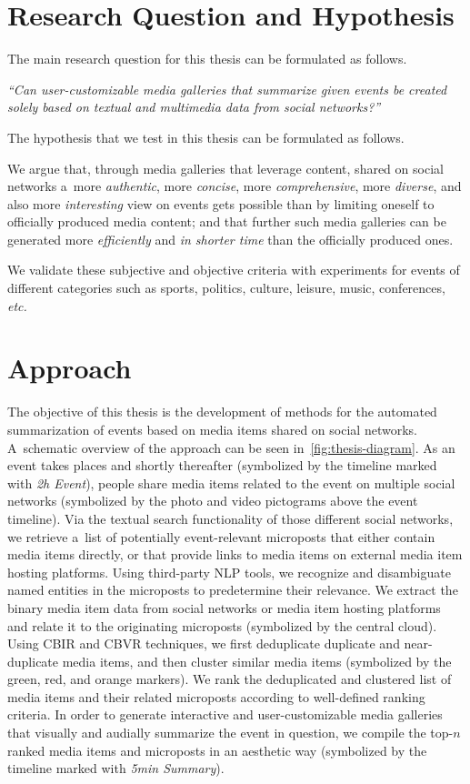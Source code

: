 \section{Research Question and Hypothesis}

The main research question for this thesis
can be formulated as follows.
 
\textit{``Can user-customizable
media galleries that summarize given events be
created solely based on textual and multimedia data
from social networks?''}

\noindent The hypothesis that we test in this thesis
can be formulated as follows.

We argue that,
through media galleries that leverage content,
shared on social networks
a~more \emph{authentic}, more \emph{concise},
more \emph{comprehensive}, more \emph{diverse},
and also more \emph{interesting}
view on events gets possible than by limiting oneself
to officially produced media content;
and that further such media galleries can be generated
more \emph{efficiently} and \emph{in shorter time}
than the officially produced ones.

We validate these subjective and objective
criteria with experiments for events of different categories
such as sports, politics, culture, leisure,
music, conferences, \emph{etc.}

\section{Approach}

The objective of this thesis is the development
of methods for the automated summarization of events
based on media items shared on social networks.
A~schematic overview of the approach can be seen
in~\autoref{fig:thesis-diagram}.
As an event takes places and shortly thereafter
(symbolized by the timeline marked with \emph{2h Event}),
people share media items related to the event
on multiple social networks
(symbolized by the photo and video pictograms
above the event timeline).
Via the textual search functionality of those
different social networks,
we retrieve a~list of potentially event-relevant
microposts that either contain media items directly,
or that provide links to media items
on external media item hosting platforms.
Using third-party NLP tools,
we recognize and disambiguate named entities
in the microposts to predetermine their relevance.
We extract the binary media item data
from social networks or media item hosting platforms
and relate it to the originating microposts
(symbolized by the central cloud).
Using CBIR and CBVR techniques, we first deduplicate
duplicate and near-duplicate media items,
and then cluster similar media items
(symbolized by the green, red, and orange markers).
We rank the deduplicated and clustered list
of media items and their related microposts
according to well-defined ranking criteria.
In order to generate interactive and user-customizable
media galleries that visually and audially summarize the
event in question, we compile the top-$n$ ranked
media items and microposts in an aesthetic way
(symbolized by the timeline marked with \emph{5min Summary}).

